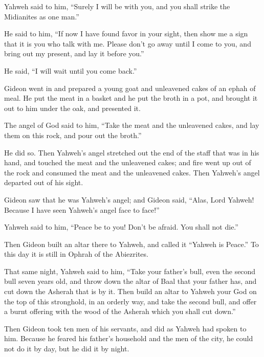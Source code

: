 {\par }{\PP {}Yahweh said to him, “Surely I will be with you, and you shall strike the Midianites as one man.”
\par }{\PP {}He said to him, “If now I have found favor in your sight, then show me a sign that it is you who talk with me.
Please don’t go away until I come to you, and bring out my present, and lay it before you.”
\par }{\PP He said, “I will wait until you come back.”
\par }{\PP {}Gideon went in and prepared a young goat and unleavened cakes of an ephah
 of meal. He put the meat in a basket and he put the broth in a pot, and brought it out to him under the oak, and presented it.
\par }{\PP {}The angel of God said to him, “Take the meat and the unleavened cakes, and lay them on this rock, and pour out the broth.”
\par }{\PP He did so.
Then Yahweh’s angel stretched out the end of the staff that was in his hand, and touched the meat and the unleavened cakes; and fire went up out of the rock and consumed the meat and the unleavened cakes. Then Yahweh’s angel departed out of his sight.
\par }{\PP {}Gideon saw that he was Yahweh’s angel; and Gideon said, “Alas, Lord Yahweh! Because I have seen Yahweh’s angel face to face!”
\par }{\PP {}Yahweh said to him, “Peace be to you! Don’t be afraid. You shall not die.”
\par }{\PP {}Then Gideon built an altar there to Yahweh, and called it “Yahweh is Peace.” To this day it is still in Ophrah of the Abiezrites.
\par }{\PP {}That same night, Yahweh said to him, “Take your father’s bull, even the second bull seven years old, and throw down the altar of Baal that your father has, and cut down the Asherah that is by it.
Then build an altar to Yahweh your God on the top of this stronghold, in an orderly way, and take the second bull, and offer a burnt offering with the wood of the Asherah which you shall cut down.”
\par }{\PP {}Then Gideon took ten men of his servants, and did as Yahweh had spoken to him. Because he feared his father’s household and the men of the city, he could not do it by day, but he did it by night.
}
